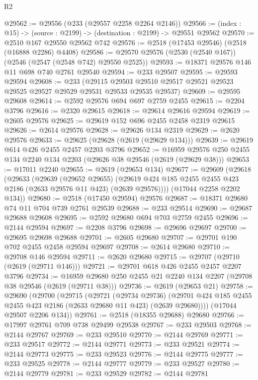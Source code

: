 \begin{lexlean}{R2}
\begin{coremodule}
@29562 := @29556 (@233 (@29557 @2258 @2264 @2146))
@29566 := (index : @15) -> (source : @2199) -> (destination : @2199) -> @29551 @29562
@29570 := @2510 @167 @29550 @29562 @742
@29576 := @2518 (@17453 @29546) (@2518 (@16888 @2286) @4408)
@29586 := @29570 @29576 (@2530 (@2540 @167)) (@2546 (@2547 (@2548 @742) @29550 @2525))
@29593 := @18371 @29576 @146 @11 @698 @740 @2761 @29540
@29594 := @233 @29507
@29595 := @29593 @29594
@29608 := @233
    (@29115 @29503 @29510 @29517 @29521 @29523 @29525 @29527 @29529 @29531 @29533 @29535 @29537)
@29609 := @29595 @29608
@29614 := @2592 @29576 @694 @697 @2759 @2455
@29615 := @2204 @3796
@29616 := @2320 @29615
@29618 := @29614 @29616 @29594
@29619 := @2605 @29576
@29625 := @29619 @152 @696 @2455 @2458 @2319 @29615
@29626 := @2614 @29576
@29628 := @29626 @134 @2319
@29629 := @2620 @29576
@29633 := @29625 (@29628 (@2619 (@29629 @134)))
@29639 := @29619 @614 @426 @2455 @2457 @2203 @3796
@29652 := @16959 @29576 @250 @2455 @134 @2240 @134 @2203 (@29626 @38 @29546 (@2619 (@29629 @38)))
@29653 := @17011 @2240
@29655 := @2619 (@29653 @134)
@29677 := @29609
    (@29618
      (@29633
        (@29639
          (@29652 @29655)
          (@29619 @424 @185 @2455 @2455 @423 @2186 (@2633 @29576 @11 @423) (@2639 @29576))))
      (@17044 @2258 @2202 @134))
@29680 := @2518 (@17450 @29594) @29576
@29687 := @18371 @29680 @74 @11 @704 @739 @2761 @29539
@29688 := @233 @29514
@29690 := @29687 @29688 @29608
@29695 := @2592 @29680 @694 @703 @2759 @2455
@29696 := @2144 @29594
@29697 := @2208 @3796
@29698 := @29696 @29697
@29700 := @29695 @29698 @29688
@29701 := @2605 @29680
@29707 := @29701 @190 @702 @2455 @2458 @29594 @29697
@29708 := @2614 @29680
@29710 := @29708 @146 @29594
@29711 := @2620 @29680
@29715 := @29707 (@29710 (@2619 (@29711 @146)))
@29721 := @29701 @618 @426 @2455 @2457 @2207 @3796
@29734 := @16959 @29680 @250 @2455 @21 @2240 @134 @2207 (@29708 @38 @29546 (@2619 (@29711 @38)))
@29736 := @2619 (@29653 @21)
@29758 := @29690
    (@29700
      (@29715
        (@29721
          (@29734 @29736)
          (@29701 @424 @185 @2455 @2455 @423 @2186 (@2633 @29680 @11 @423) (@2639 @29680))))
      (@17044 @29507 @2206 @134))
@29761 := @2518 (@18355 @29688) @29680
@29766 := @17997 @29761 @709 @738 @29499 @29538
@29767 := @233 @29503
@29768 := @2144 @29767
@29769 := @233 @29510
@29770 := @2144 @29769
@29771 := @233 @29517
@29772 := @2144 @29771
@29773 := @233 @29521
@29774 := @2144 @29773
@29775 := @233 @29523
@29776 := @2144 @29775
@29777 := @233 @29525
@29778 := @2144 @29777
@29779 := @233 @29527
@29780 := @2144 @29779
@29781 := @233 @29529
@29782 := @2144 @29781

\end{coremodule}
\end{lexlean}
